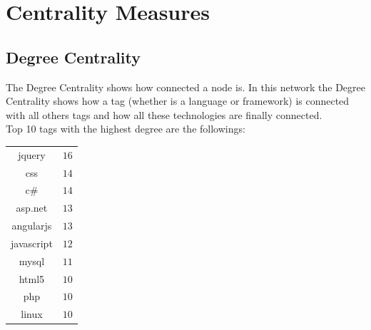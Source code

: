 \documentclass[12pt]{article}
\begin{document}
	\section{Centrality Measures}
		\subsection{Degree Centrality}
			The Degree Centrality shows how connected a node is. In this network the Degree Centrality shows how a tag (whether is a language or framework) is connected with all others tags and how all these technologies are finally connected. \\
			Top 10 tags with the highest degree are the followings:
			\begin{center}
				\begin{tabular}{ |c|c| } 
					\hline
					jquery & $16$  \\ 
					css & $14$ \\
					c\# & $14$ \\
					asp.net & $13$ \\
					angularjs & $13$ \\
					javascript &$12$ \\
					mysql & $11$ \\
					html5 & $10$ \\
					php & $10$ \\
					linux & $10$ \\
					\hline
				\end{tabular}
			\end{center}
\end{document}
